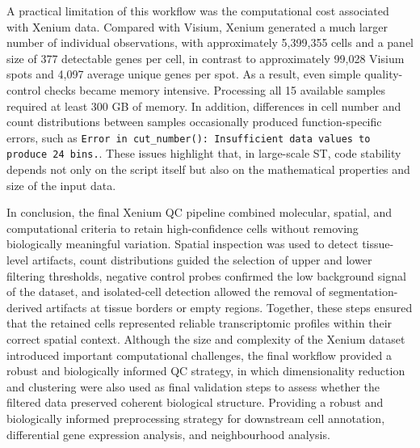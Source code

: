 A practical limitation of this workflow was the computational cost associated with Xenium data. Compared with Visium, Xenium generated a much larger number of individual observations, with approximately 5,399,355 cells and a panel size of 377 detectable genes per cell, in contrast to approximately 99,028 Visium spots and 4,097 average unique genes per spot. As a result, even simple quality-control checks became memory intensive. Processing all 15 available samples required at least 300 GB of memory. In addition, differences in cell number and count distributions between samples occasionally produced function-specific errors, such as \texttt{Error in \textasciigrave cut\_number()\textasciigrave: Insufficient data values to produce 24 bins.}. These issues highlight that, in large-scale ST, code stability depends not only on the script itself but also on the mathematical properties and size of the input data.

In conclusion, the final Xenium QC pipeline combined molecular, spatial, and computational criteria to retain high-confidence cells without removing biologically meaningful variation. Spatial inspection was used to detect tissue-level artifacts, count distributions guided the selection of upper and lower filtering thresholds, negative control probes confirmed the low background signal of the dataset, and isolated-cell detection allowed the removal of segmentation-derived artifacts at tissue borders or empty regions. Together, these steps ensured that the retained cells represented reliable transcriptomic profiles within their correct spatial context. Although the size and complexity of the Xenium dataset introduced important computational challenges, the final workflow provided a robust and biologically informed QC strategy, in which dimensionality reduction and clustering were also used as final validation steps to assess whether the filtered data preserved coherent biological structure. Providing a robust and biologically informed preprocessing strategy for downstream cell annotation, differential gene expression analysis, and neighbourhood analysis.




